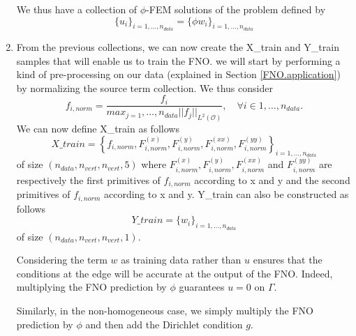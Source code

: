 \begin{enumerate}[label=\textbullet]
	We thus have a collection of $\phi$-FEM solutions of the problem defined by
	\begin{equation*}
		\{u_i\}_{i=1,\dots,n_{data}}=\{\phi w_i\}_{i=1,\dots,n_{data}}
	\end{equation*}
	
	\item From the previous collections, we can now create the X\_train and Y\_train samples that will enable us to train the FNO. we will start by performing a kind of pre-processing on our data (explained in Section \ref{FNO.application}) by normalizing the source term collection. We thus consider
	\begin{equation*}
		f_{i,norm} = \frac{f_i}{max_{j=1},\dots,n_{data} ||f_j||_{L^2(\mathcal{O})}}, \quad \forall i\in 1,\dots,n_{data}.
	\end{equation*}
	We can now define X\_train as follows
	\begin{equation*}
		X\_train =  \left\{f_{i,norm},F_{i,norm}^{(x)},F_{i,norm}^{(y)},F_{i,norm}^{(xx)},F_{i,norm}^{(yy)}\right\}_{i=1,\dots,n_{data}}
	\end{equation*}
	of size $(n_{data},n_{vert},n_{vert},5)$ where $F_{i,norm}^{(x)},F_{i,norm}^{(y)},F_{i,norm}^{(xx)}$ and $F_{i,norm}^{(yy)}$ are respectively the first primitives of $f_{i,norm}$ according to x and y and the second primitives of $f_{i,norm}$ according to x and y.
	Y\_train can also be constructed as follows
	\begin{equation*}
		Y\_train = \{w_i\}_{i=1,\dots,n_{data}}
	\end{equation*}
	of size $(n_{data},n_{vert},n_{vert},1)$.
	
	\begin{Rem}
		Considering the term $w$ as training data rather than $u$ ensures that the conditions at the edge will be accurate at the output of the FNO. Indeed, multiplying the FNO prediction by $\phi$ guarantees $u=0$ on $\Gamma$. 
		
		Similarly, in the non-homogeneous case, we simply multiply the FNO prediction by $\phi$ and then add the Dirichlet condition $g$.
	\end{Rem}
	

\end{enumerate}
